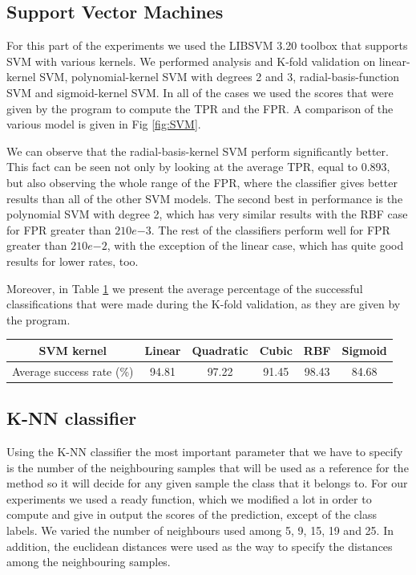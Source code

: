 \subsection{Support Vector Machines}
\noindent For this part of the experiments we used the LIBSVM 3.20 toolbox that supports SVM with various kernels.  We performed analysis and K-fold validation on linear-kernel SVM, polynomial-kernel SVM with degrees 2 and 3, radial-basis-function SVM and sigmoid-kernel SVM. In all of the cases we used the scores that were given by the program to compute the TPR and the FPR. A comparison of the various model is given in Fig \ref{fig:SVM}.

\noindent We can observe that the radial-basis-kernel SVM perform significantly better. This fact can be seen not only by looking at the average TPR, equal to 0.893, but also observing the whole range of the FPR, where the classifier gives better results than all of the other SVM models. The second best in performance is the polynomial SVM with degree 2, which has very similar results with the RBF case for FPR greater than $2 10e{-3}$. The rest of the classifiers perform well for FPR greater than $2 10e{-2}$, with the exception of the linear case, which has quite good results for lower rates, too.

\noindent Moreover, in Table \ref{table:SVM_success} we present the average percentage of the successful classifications that were made during the K-fold validation, as they are given by the program.

\begin{table}[h]
  \centering
  \begin{tabular}{ | c | c | c | c | c | c |}
  \hline
  SVM kernel & Linear & Quadratic & Cubic & RBF & Sigmoid \\ \hline
  Average success rate (\%) & 94.81 & 97.22 & 91.45 & 98.43 & 84.68 \\ \hline
  \end{tabular}
  \label{table:SVM_success}
\end{table}
    
\subsection{K-NN classifier}
\noindent Using the K-NN classifier the most important parameter that we have to specify is the number of the neighbouring samples that will be used as a reference for the method so it will decide for any given sample the class that it belongs to. For our experiments we used a ready function, which we modified a lot in order to compute and give in output the scores of the prediction, except of the class labels. We varied the number of neighbours used among 5, 9, 15, 19 and 25. In addition, the euclidean distances were used as the way to specify the distances among the neighbouring samples.

